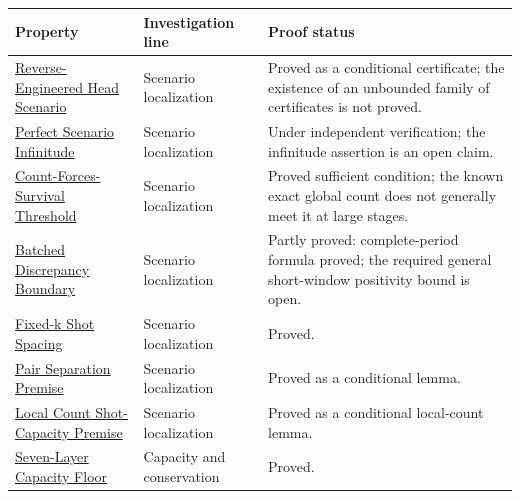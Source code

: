 {\raggedright
\begin{longtable}{>{\raggedright\arraybackslash}p{}>{\raggedright\arraybackslash}p{}>{\raggedright\arraybackslash}p{}}
\textbf{Property} & \textbf{Investigation line} & \textbf{Proof status}\\
\hline
\endhead
\href{https://github.com/thiagomata/prime-numbers/blob/master/properties/sieve-sequence/reverse-engineered-eventual-head-scenario.md}{Reverse-Engineered Head Scenario} & Scenario localization & Proved as a conditional certificate; the existence of an unbounded family of certificates is not proved.\\
\href{https://github.com/thiagomata/prime-numbers/blob/master/candidates/infinite-perfect-scenario-property.md}{Perfect Scenario Infinitude} & Scenario localization & Under independent verification; the infinitude assertion is an open claim.\\
\href{https://github.com/thiagomata/prime-numbers/blob/master/properties/sieve-sequence/global-count-forcing-local-survival.md}{Count-Forces-Survival Threshold} & Scenario localization & Proved sufficient condition; the known exact global count does not generally meet it at large stages.\\
\href{https://github.com/thiagomata/prime-numbers/blob/master/properties/sieve-sequence/batched-short-window-discrepancy-boundary.md}{Batched Discrepancy Boundary} & Scenario localization & Partly proved: complete-period formula proved; the required general short-window positivity bound is open.\\
\href{https://github.com/thiagomata/prime-numbers/blob/master/properties/sieve-sequence/stable-small-k-shot-spacing.md}{Fixed-k Shot Spacing} & Scenario localization & Proved.\\
\href{https://github.com/thiagomata/prime-numbers/blob/master/properties/sieve-sequence/interval-premise-from-pair-existence.md}{Pair Separation Premise} & Scenario localization & Proved as a conditional lemma.\\
\href{https://github.com/thiagomata/prime-numbers/blob/master/properties/sieve-sequence/local-count-forces-k2-shot-capacity.md}{Local Count Shot-Capacity Premise} & Scenario localization & Proved as a conditional local-count lemma.\\
\href{https://github.com/thiagomata/prime-numbers/blob/master/properties/sieve-sequence/exact-seven-layer-capacity-floor.md}{Seven-Layer Capacity Floor} & Capacity and conservation & Proved.\\

\end{longtable}}
